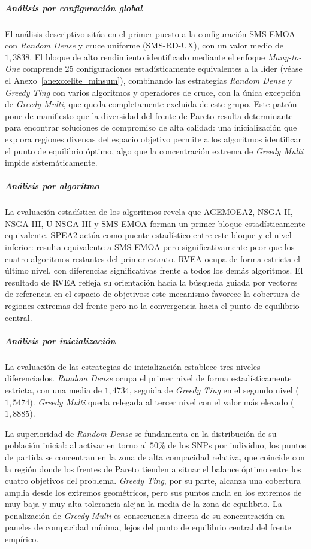 \subparagraph{Análisis por configuración global}

El análisis descriptivo sitúa en el primer puesto a la configuración SMS-EMOA con \textit{Random Dense} y cruce uniforme (SMS-RD-UX), con un valor medio de $1{,}3838$. El bloque de alto rendimiento identificado mediante el enfoque \textit{Many-to-One} comprende 25 configuraciones estadísticamente equivalentes a la líder (véase el Anexo~\ref{anexo:elite_minsum}), combinando las estrategias \textit{Random Dense} y \textit{Greedy Ting} con varios algoritmos y operadores de cruce, con la única excepción de \textit{Greedy Multi}, que queda completamente excluida de este grupo. Este patrón pone de manifiesto que la diversidad del frente de Pareto resulta determinante para encontrar soluciones de compromiso de alta calidad: una inicialización que explora regiones diversas del espacio objetivo permite a los algoritmos identificar el punto de equilibrio óptimo, algo que la concentración extrema de \textit{Greedy Multi} impide sistemáticamente.

\subparagraph{Análisis por algoritmo}

La evaluación estadística de los algoritmos revela que AGEMOEA2, NSGA-II, NSGA-III, U-NSGA-III y SMS-EMOA forman un primer bloque estadísticamente equivalente. SPEA2 actúa como puente estadístico entre este bloque y el nivel inferior: resulta equivalente a SMS-EMOA pero significativamente peor que los cuatro algoritmos restantes del primer estrato. RVEA ocupa de forma estricta el último nivel, con diferencias significativas frente a todos los demás algoritmos. El resultado de RVEA refleja su orientación hacia la búsqueda guiada por vectores de referencia en el espacio de objetivos: este mecanismo favorece la cobertura de regiones extremas del frente pero no la convergencia hacia el punto de equilibrio central.

\subparagraph{Análisis por inicialización}

La evaluación de las estrategias de inicialización establece tres niveles diferenciados. \textit{Random Dense} ocupa el primer nivel de forma estadísticamente estricta, con una media de $1{,}4734$, seguida de \textit{Greedy Ting} en el segundo nivel ($1{,}5474$). \textit{Greedy Multi} queda relegada al tercer nivel con el valor más elevado ($1{,}8885$).

La superioridad de \textit{Random Dense} se fundamenta en la distribución de su población inicial: al activar en torno al $50\%$ de los SNPs por individuo, los puntos de partida se concentran en la zona de alta compacidad relativa, que coincide con la región donde los frentes de Pareto tienden a situar el balance óptimo entre los cuatro objetivos del problema. \textit{Greedy Ting}, por su parte, alcanza una cobertura amplia desde los extremos geométricos, pero sus puntos ancla en los extremos de muy baja y muy alta tolerancia alejan la media de la zona de equilibrio. La penalización de \textit{Greedy Multi} es consecuencia directa de su concentración en paneles de compacidad mínima, lejos del punto de equilibrio central del frente empírico.

